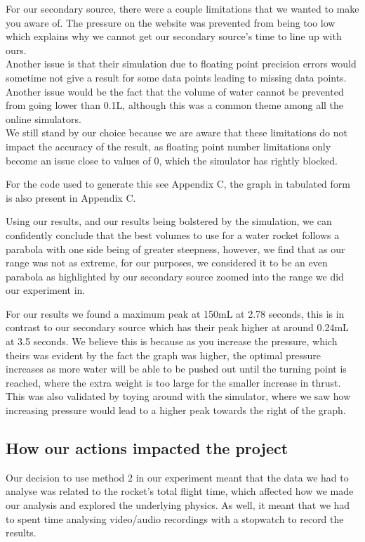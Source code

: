 \documentclass[14pt]{article}
\begin{document}
\FloatBarrier
For our secondary source, there were a couple limitations that we wanted to make you aware of. The pressure on the website was prevented from being too low which explains why we cannot get our secondary source's time to line up with ours. \\Another issue is that their simulation due to floating point precision errors would sometime not give a result for some data points leading to missing data points. \\
Another issue would be the fact that the volume of water cannot be prevented from going lower than 0.1L, although this was a common theme among all the online simulators.\\
We still stand by our choice because we are aware that these limitations do not impact the accuracy of the result, as floating point number limitations only become an issue close to values of 0, which the simulator has rightly blocked.

For the code used to generate this see Appendix C, the graph in tabulated form is also present in Appendix C.

Using our results, and our results being bolstered by the simulation, we can confidently conclude that the best volumes to use for a water rocket follows a parabola with one side being of greater steepness, however, we find that as our range was not as extreme, for our purposes, we considered it to be an even parabola as highlighted by our secondary source zoomed into the range we did our experiment in.

For our results we found a maximum peak at 150mL at 2.78 seconds, this is in contrast to our secondary source which has their peak higher at around 0.24mL at 3.5 seconds. We believe this is because as you increase the pressure, which theirs was evident by the fact the graph was higher, the optimal pressure increases as more water will be able to be pushed out until the turning point is reached, where the extra weight is too large for the smaller increase in thrust. This was also validated by toying around with the simulator, where we saw how increasing pressure would lead to a higher peak towards the right of the graph.
 
\subsection{How our actions impacted the project}
Our decision to use method 2 in our experiment meant that the data we had to analyse was related to the rocket's total flight time, which affected how we made our analysis and explored the underlying physics. As well, it meant that we had to spent time analysing video/audio recordings with a stopwatch to record the results.
\end{document}
